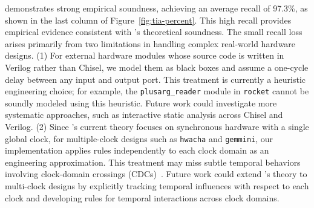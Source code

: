 \tia demonstrates strong empirical soundness, achieving an average recall of 97.3\%, as shown in the last column of Figure~\ref{fig:tia-percent}.
This high recall provides empirical evidence consistent with \tia's theoretical soundness. %
The small recall loss arises primarily from two limitations in handling complex real-world hardware designs.
(1) For external hardware modules whose source code is written in Verilog rather than Chisel, we model them as black boxes and assume a one-cycle delay between any input and output port.
This treatment is currently a heuristic engineering choice;
for example, the \texttt{plusarg\_reader} module in \texttt{rocket} cannot be soundly modeled using this heuristic.
Future work could investigate more systematic approaches, such as interactive static analysis across Chisel and Verilog.
(2) Since \tia's current theory focuses on synchronous hardware with a single global clock, for multiple-clock designs such as \texttt{hwacha} and \texttt{gemmini}, our implementation applies \tia rules independently to each clock domain as an engineering approximation.
This treatment may miss subtle temporal behaviors involving clock-domain crossings (CDCs)~\cite{chong_clock_2021}.
Future work could extend \tia's theory to multi-clock designs by explicitly tracking temporal influences with respect to each clock and developing rules for temporal interactions across clock domains.

